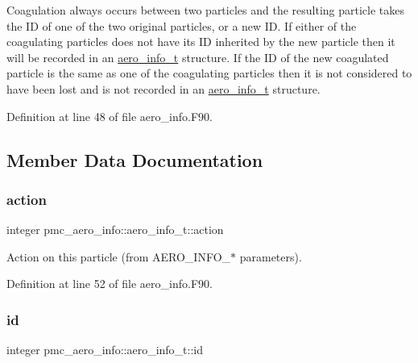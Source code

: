 Coagulation always occurs between two particles and the resulting particle takes the ID of one of the two original particles, or a new ID. If either of the coagulating particles does not have its ID inherited by the new particle then it will be recorded in an {\ttfamily \mbox{\hyperlink{structpmc__aero__info_1_1aero__info__t}{aero\+\_\+info\+\_\+t}}} structure. If the ID of the new coagulated particle is the same as one of the coagulating particles then it is not considered to have been lost and is not recorded in an \mbox{\hyperlink{structpmc__aero__info_1_1aero__info__t}{aero\+\_\+info\+\_\+t}} structure. 

Definition at line 48 of file aero\+\_\+info.\+F90.



\subsection{Member Data Documentation}
\mbox{\label{structpmc__aero__info_1_1aero__info__t_adf0e46de86eaf1af56c1745a6c15cd9d}} 
\subsubsection{\texorpdfstring{action}{action}}
{\footnotesize\ttfamily integer pmc\+\_\+aero\+\_\+info\+::aero\+\_\+info\+\_\+t\+::action}



Action on this particle (from A\+E\+R\+O\+\_\+\+I\+N\+F\+O\+\_\+$\ast$ parameters). 



Definition at line 52 of file aero\+\_\+info.\+F90.

\mbox{\label{structpmc__aero__info_1_1aero__info__t_a952ee41af2ab709e5d15827492f7433c}} 
\subsubsection{\texorpdfstring{id}{id}}
{\footnotesize\ttfamily integer pmc\+\_\+aero\+\_\+info\+::aero\+\_\+info\+\_\+t\+::id}



